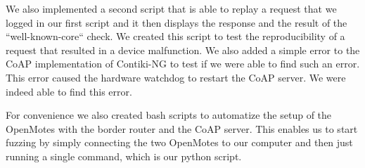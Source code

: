 We also implemented a second script that is able to replay a request that we logged in our first script and it then displays the response and the result of the ``well-known-core`` check. We created this script to test the reproducibility of a request that resulted in a device malfunction. We also added a simple error to the CoAP implementation of Contiki-NG to test if we were able to find such an error. This error caused the hardware watchdog to restart the CoAP server. We were indeed able to find this error.

For convenience we also created bash scripts to automatize the setup of the OpenMotes with the border router and the CoAP server. This enables us to start fuzzing by simply connecting the two OpenMotes to our computer and then just running a single command, which is our python script.
